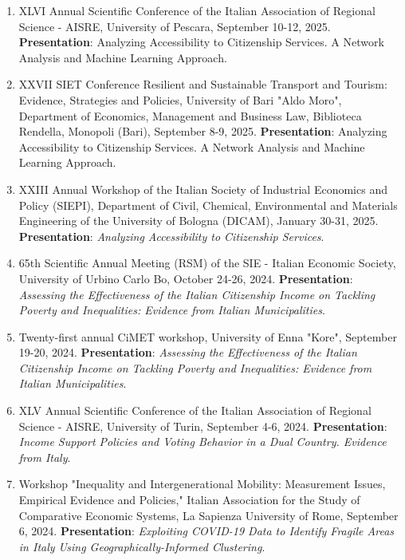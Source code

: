 \documentclass[11pt,a4paper,sans]{moderncv} %
\begin{document}
\begin{enumerate}[label=\arabic*.]
    \item XLVI Annual Scientific Conference of the Italian Association of Regional Science - AISRE, University of Pescara, September 10-12, 2025. \textbf{Presentation}: Analyzing Accessibility to Citizenship Services. A Network Analysis and Machine Learning Approach.


    \item XXVII SIET Conference Resilient and Sustainable Transport and Tourism: Evidence, Strategies and Policies, University of Bari "Aldo Moro", Department of Economics, Management and Business Law, Biblioteca Rendella, Monopoli (Bari), September 8-9, 2025. \textbf{Presentation}: Analyzing Accessibility to Citizenship Services. A Network Analysis and Machine Learning Approach.

        
    \item XXIII Annual Workshop of the Italian Society of Industrial Economics and Policy (SIEPI), Department of Civil, Chemical, Environmental and Materials Engineering of the University of Bologna (DICAM), January 30-31, 2025. \textbf{Presentation}: \textit{Analyzing Accessibility to Citizenship Services}.
        
    
    \item 65th Scientific Annual Meeting (RSM) of the SIE - Italian Economic Society, University of Urbino Carlo Bo, October 24-26, 2024. \textbf{Presentation}: \textit{Assessing the Effectiveness of the Italian Citizenship Income on Tackling Poverty and Inequalities: Evidence from Italian Municipalities}.
        
    \item Twenty-first annual CiMET workshop, University of Enna "Kore", September 19-20, 2024. \textbf{Presentation}: \textit{Assessing the Effectiveness of the Italian Citizenship Income on Tackling Poverty and Inequalities: Evidence from Italian Municipalities}.
        
    
    \item XLV Annual Scientific Conference of the Italian Association of Regional Science - AISRE, University of Turin, September 4-6, 2024. \textbf{Presentation}: \textit{Income Support Policies and Voting Behavior in a Dual Country. Evidence from Italy}.
        
    \item Workshop "Inequality and Intergenerational Mobility: Measurement Issues, Empirical Evidence and Policies," Italian Association for the Study of Comparative Economic Systems, La Sapienza University of Rome, September 6, 2024. \textbf{Presentation}: \textit{Exploiting COVID-19 Data to Identify Fragile Areas in Italy Using Geographically-Informed Clustering}.
        

\end{enumerate}
\end{document}

